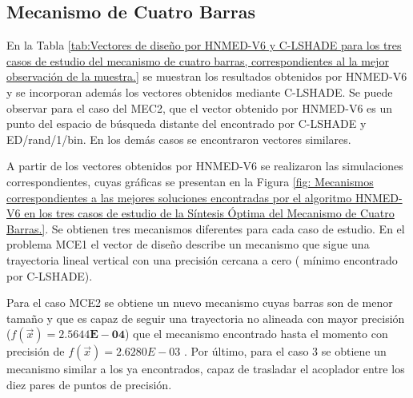 \subsection{Mecanismo de Cuatro Barras}
En la Tabla \ref{tab:Vectores de diseño por HNMED-V6 y C-LSHADE para los tres casos de estudio del mecanismo de cuatro barras, correspondientes al la mejor observación de la muestra.} se muestran los resultados obtenidos por HNMED-V6 y se incorporan además los vectores obtenidos mediante C-LSHADE. Se puede observar para el caso del MEC2, que el vector obtenido por HNMED-V6 es un punto del espacio de búsqueda distante del encontrado por C-LSHADE y ED/rand/1/bin. En los demás casos se encontraron vectores similares.  

A partir de los vectores obtenidos por HNMED-V6 se realizaron las simulaciones correspondientes, cuyas gráficas se presentan en la Figura \ref{fig: Mecanismos correspondientes a las mejores soluciones encontradas por el algoritmo HNMED-V6 en los
	tres casos de estudio de la Síntesis Óptima del Mecanismo de Cuatro Barras.}. Se obtienen tres mecanismos diferentes para cada caso de estudio. En el problema MCE1 el vector de diseño describe un mecanismo que sigue una trayectoria lineal vertical con una precisión cercana a cero ( mínimo encontrado por C-LSHADE). 

Para el caso MCE2 se obtiene un nuevo mecanismo cuyas barras son de menor tamaño y que es capaz de seguir una trayectoria no alineada con mayor precisión ($f(\vec{x})=\boldsymbol{2.5644E-04}$) que el mecanismo encontrado hasta el momento con precisión de $f(\vec{x})=2.6280E-03$ . Por último, para el caso 3 se obtiene un mecanismo similar a los ya encontrados, capaz de trasladar el acoplador entre los diez pares de puntos de precisión.


